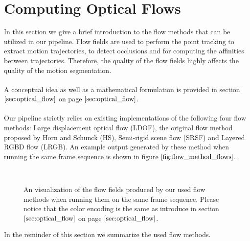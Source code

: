 \section{Computing Optical Flows}
\label{sec:impl_optical_flow}
In this section we give a brief introduction to the flow methods that can be utilized in our pipeline. Flow fields are used to perform the point tracking to extract motion trajectories, to detect occlusions and for computing the affinities between trajectories. Therefore, the quality of the flow fields highly affects the quality of the motion segmentation. \\ \\
A conceptual idea as well as a mathematical formulation is provided in section $\ref{sec:optical_flow}$ on page $\pageref{sec:optical_flow}$. \\ \\
Our pipeline strictly relies on existing implementations of the following four flow methods: Large displacement optical flow (LDOF), the original flow method proposed by Horn and Schunck (HS), Semi-rigid scene flow (SRSF) and Layered RGBD flow (LRGB). An example output generated by these method when running the same frame sequence is shown in figure $\ref{fig:flow_method_flows}$.  
\begin{figure}[H]
\begin{center}
~
\end{center}
\caption[Flow Method Flows]{An visualization of the flow fields produced by our used flow methods when running them on the same frame sequence. Please notice that the color encoding is the same as introduce in section $\ref{sec:optical_flow}$ on page $\pageref{sec:optical_flow}$.}
\label{fig:flow_method_flows}
\end{figure}
In the reminder of this section we summarize the used flow methods.

